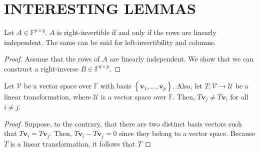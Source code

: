 \documentclass[12pt]{article}
\newenvironment{lemma}[2][Lemma]{\begin{trivlist} \item[\hskip \labelsep {\bfseries #1}\hskip \labelsep {\bfseries #2.}]}{\end{trivlist}}
\begin{document}
\section{INTERESTING LEMMAS}

\begin{lemma}{1}
  Let $A\in \mathbb{F}^{p\times q}$. $A$ is right-invertible if and only if the rows are linearly independent. The same can be said for left-invertibility and columns.
\begin{proof}
  Assume that the rows of $A$ are linearly independent. We show that we can construct a right-inverse $B\in \mathbb{F}^{q\times p}$. 
\end{proof} 
\end{lemma}
\begin{lemma}{2}
  Let $\mathcal{V}$ be a vector space over $\mathbb{F}$ with basis $\left\{ \mathbf{v}_{1},\dots,\mathbf{v}_{p} \right\}$. Also, let $T:\mathcal{V}\to \mathcal{U}$ be a linear transformation, where $\mathcal{U}$ is a vector space over $\mathbb{F}$. Then, $T\mathbf{v}_{j} \neq T\mathbf{v}_{i}$ for all $i\neq j$. 
\begin{proof}
  Suppose, to the contrary, that there are two distinct basis vectors such that $T\mathbf{v}_{i} = T\mathbf{v}_{j}$. Then, $T\mathbf{v}_{i} - T\mathbf{v}_{j}=0$ since they belong to a vector space. Because $T$ is a linear transformation, it follows that $T$
\end{proof}
\end{lemma}
\end{document}
